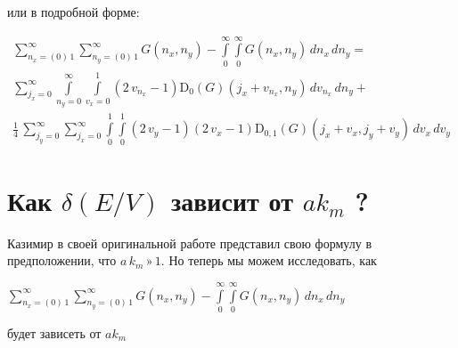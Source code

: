 \documentclass[11pt]{article}
\begin{document}
    или в подробной форме:

\begin{equation}
\begin{array}{l}
\sum\limits_{n_x=\left(0\right)\,1}^{\infty}
\sum\limits_{n_y=\left(0\right)\,1}^{\infty}
G\left(n_x, n_y\right)
-
\int\limits_{0}^{\infty}
\int\limits_{0}^{\infty}
G\left(n_x, n_y\right)\,d{n_x}\,d{n_y} = \\
{\sum\limits_{j_{x}=0}^{\infty} \int\limits_{n_{y}=0}^{\infty} \int\limits_{v_x=0}^{1}  {\left(2 \, v_{n_{x}} - 1\right)} \mathrm{D}_{0}\left(G\right)\left(j_{x} + v_{n_{x}}, n_{y}\right)\,{d v_{n_{x}}}\,{d n_{y}}} + \\
\frac{1}{4} \, {\sum\limits_{j_{y}=0}^{\infty} {\sum\limits_{j_{x}=0}^{\infty} \int\limits_{0}^{1} \int\limits_{0}^{1} {\left(2 \, v_{y} - 1\right)} {\left(2 \, v_{x} - 1\right)} \mathrm{D}_{0, 1}\left(G\right)\left(j_{x} + v_{x}, j_{y} + v_{y}\right)\,{d v_{x}}}\,{d v_{y}}}
\end{array}
\end{equation}

    \section{\texorpdfstring{Как \(\delta\left(E/V\right)\) зависит от
\(a k_m\)
?}{Как \textbackslash{}delta\textbackslash{}left(E/V\textbackslash{}right) зависит от a k\_m ?}}\label{ux43aux430ux43a-deltaleftevright-ux437ux430ux432ux438ux441ux438ux442-ux43eux442-a-k_m}

    Казимир в своей оригинальной работе представил свою формулу в
предположении, что \(a\,k_m\,»\,1\). Но теперь мы можем исследовать, как

\(\sum\limits_{n_x=\left(0\right)\,1}^{\infty} \sum\limits_{n_y=\left(0\right)\,1}^{\infty} G\left(n_x, n_y\right) - \int\limits_{0}^{\infty} \int\limits_{0}^{\infty} G\left(n_x, n_y\right)\,d{n_x}\,d{n_y}\)

будет зависеть от \(a k_m\)
\end{document}
